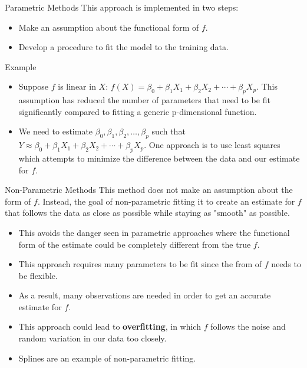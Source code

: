 \documentclass[
  ignorenonframetext,
  aspectratio=169,
]{beamer}
\providecommand{\tightlist}{%
  \setlength{\itemsep}{0pt}\setlength{\parskip}{0pt}}\usepackage{longtable,booktabs,array}
\begin{document}
\begin{frame}{Parametric Methods}
\protect\hypertarget{parametric-methods}{}
This approach is implemented in two steps:

\begin{itemize}
\tightlist
\item
  Make an assumption about the functional form of \(f\).
\item
  Develop a procedure to fit the model to the training data.
\end{itemize}

\begin{block}{Example}
\protect\hypertarget{example}{}
\begin{itemize}
\tightlist
\item
  Suppose \(f\) is linear in \(X\):
  \(f(X)=\beta_{0}+\beta_{1} X_{1}+\beta_{2} X_{2}+\cdots+\beta_{p} X_{p}\).
  This assumption has reduced the number of parameters that need to be
  fit significantly compared to fitting a generic p-dimensional
  function.
\item
  We need to estimate
  \(\beta_{0}, \beta_{1}, \beta_{2}, \dots, \beta_{p}\) such that
  \(Y \approx \beta_{0}+\beta_{1} X_{1}+\beta_{2} X_{2}+\cdots+\beta_{p} X_{p}\).
  One approach is to use least squares which attempts to minimize the
  difference between the data and our estimate for \(f\).
\end{itemize}
\end{block}
\end{frame}

\begin{frame}{Non-Parametric Methods}
\protect\hypertarget{non-parametric-methods}{}
This method does not make an assumption about the form of \(f\).
Instead, the goal of non-parametric fitting it to
\alert{create an estimate for $f$ that follows the data as close as possible while staying as "smooth" as possible}.

\begin{itemize}
\tightlist
\item
  This avoids the danger seen in parametric approaches where the
  functional form of the estimate could be completely different from the
  true \(f\).
\item
  This approach requires many parameters to be fit since the from of
  \(f\) needs to be flexible.
\item
  As a result, many observations are needed in order to get an accurate
  estimate for \(f\).
\item
  This approach could lead to \textbf{overfitting}, in which \(f\)
  follows the noise and random variation in our data too closely.
\item
  Splines are an example of non-parametric fitting.
\end{itemize}
\end{frame}
\end{document}
